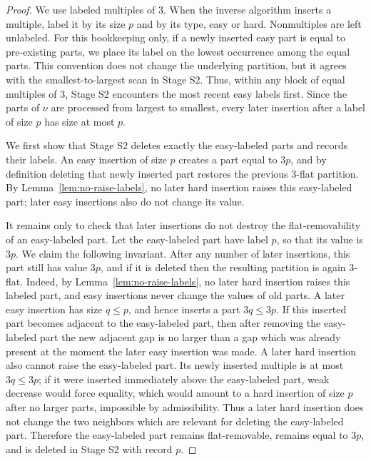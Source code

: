 \documentclass[11pt]{amsart}
\theoremstyle{definition}
\theoremstyle{remark}
\begin{document}
\begin{proof}
We use labeled multiples of $3$.  When the inverse algorithm inserts a multiple,
label it by its size $p$ and by its type, easy or hard.  Nonmultiples are left
unlabeled.  
For this bookkeeping only, if a newly inserted easy part is equal to
pre-existing parts, we place its label on the lowest occurrence among the equal
parts.  This convention does not change the underlying partition, but it agrees
with the smallest-to-largest scan in Stage S2. Thus, within any block of equal multiples of $3$, Stage S2 encounters the most
recent easy labels first.
Since the parts of $\nu$ are processed from largest to smallest, every later insertion after a label of size $p$ has size at most $p$.

\smallskip
\noindent
We first show that Stage S2 deletes exactly the easy-labeled parts and records their labels.  An easy insertion of size $p$ creates a part equal to $3p$, and by definition deleting that newly inserted part restores the previous $3$-flat partition.  By Lemma~\ref{lem:no-raise-labels}, no later hard insertion raises this easy-labeled part; later easy insertions also do not change its value.


It remains only to check that later insertions do not destroy the
flat-removability of an easy-labeled part.  Let the easy-labeled part have
label $p$, so that its value is $3p$.  We claim the following invariant.
After any number of later insertions, this part still has value $3p$, and
if it is deleted then the resulting partition is again $3$-flat.  Indeed,
by Lemma~\ref{lem:no-raise-labels}, no later hard insertion raises this
labeled part, and easy insertions never change the values of old parts.  A
later easy insertion has size $q\le p$, and hence inserts a part $3q\le 3p$.
If this inserted part becomes adjacent to the easy-labeled part, then after
removing the easy-labeled part the new adjacent gap is no larger than a gap
which was already present at the moment the later easy insertion was made.
A later hard insertion also cannot raise the easy-labeled part.  Its newly
inserted multiple is at most $3q\le 3p$; if it were inserted immediately
above the easy-labeled part, weak decrease would force equality, which would
amount to a hard insertion of size $p$ after no larger parts, impossible by
admissibility.  Thus a later hard insertion does not change the two neighbors
which are relevant for deleting the easy-labeled part.  Therefore the
easy-labeled part remains flat-removable, remains equal to $3p$, and is
deleted in Stage S2 with record $p$.


\end{proof}
\end{document}
